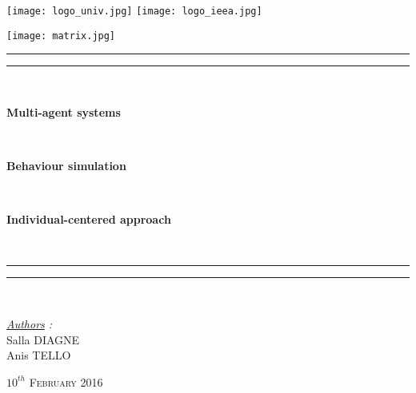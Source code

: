 \thispagestyle{cover}

\texttt{[image: logo\_univ.jpg]}
 \hfill \texttt{[image: logo\_ieea.jpg]} \\

\vspace*{3mm}

\begin{center}
	
	\texttt{[image: matrix.jpg]}
	
	\vspace*{8mm}

	\rule[0.5ex]{\linewidth}{2pt}\vspace*{-\baselineskip}\vspace*{3.2pt}
	\rule[0.5ex]{\linewidth}{1pt}\\[\baselineskip]

		\begin{Huge} \textbf{Multi-agent systems} \end{Huge}\\[4mm]
		\begin{Huge} \textbf{Behaviour simulation} \end{Huge}\\[4mm]
		\begin{Huge} \textbf{Individual-centered approach} \end{Huge}\\[4mm]
	\rule[0.5ex]{\linewidth}{1pt}\vspace*{-\baselineskip}\vspace{3.2pt}
	\rule[0.5ex]{\linewidth}{2pt}\\

	\vspace*{8mm}

	{\LARGE \textit{\underline{Authors} :}}\\
	\vspace*{3mm}
	{\LARGE Salla DIAGNE}\\
	\vspace*{3mm}
	{\LARGE Anis TELLO}\\
	
	\vspace*{20mm}
	
	{\LARGE\textsc{$10^{th}$ February 2016}}
\end{center}